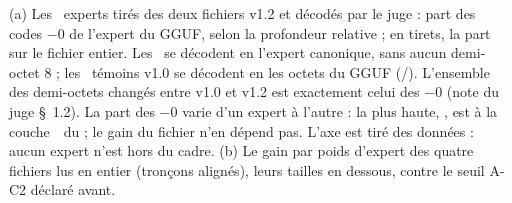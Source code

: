   {(a) Les \JconsNExperts\ experts tirés des deux fichiers v1.2 et décodés par le juge : part des codes $-0$ de
   l'expert du GGUF, selon la profondeur relative ; en tirets, la part sur le fichier entier. Les
   \JconsNExpertsTient\ se décodent en l'expert canonique, sans aucun demi-octet 8 ; les \JconsNTemoins\ témoins
   v1.0 se décodent en les octets du GGUF (\JconsNTemoinsTient/\JconsNTemoins). L'ensemble des demi-octets changés
   entre v1.0 et v1.2 est exactement celui des $-0$ (note du juge §~1.2). La part des $-0$ varie d'un expert à
   l'autre : la plus haute, \Pourcent{\JconsNPartMax}, est à la couche~\JconsNPartMaxCouche\ du
   \JconsNPartMaxModele ; le gain du fichier n'en dépend pas. L'axe est tiré des données : aucun expert n'est hors
   du cadre. (b) Le gain par poids d'expert des quatre fichiers lus en entier (tronçons alignés), leurs tailles
   en dessous, contre le seuil A-C2 déclaré avant.}

